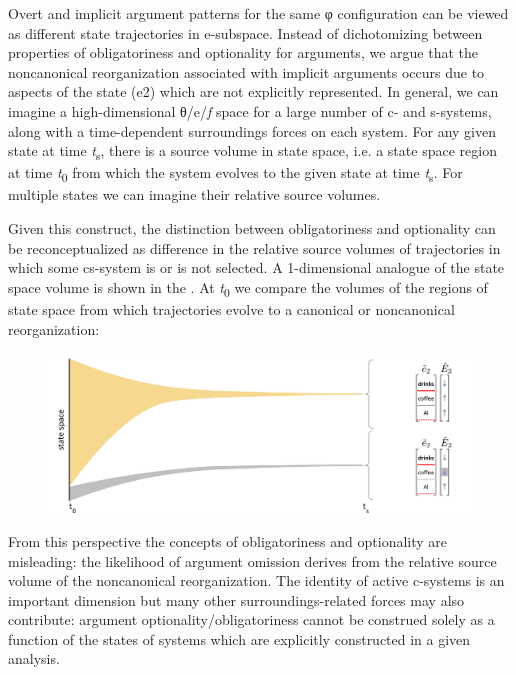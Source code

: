   Overt and implicit argument patterns for the same φ configuration can be viewed as different state trajectories in e-subspace. Instead of dichotomizing between properties of obligatoriness and optionality for arguments, we argue that the noncanonical reorganization associated with implicit arguments occurs due to aspects of the state (e2) which are not explicitly represented. In general, we can imagine a high-dimensional θ/e/\textit{f} space for a large number of c- and s-systems, along with a time-dependent surroundings forces on each system. For any given state at time \textit{t}\textsubscript{s}, there is a source volume in state space, i.e. a state space region at time \textit{t}\textsubscript{0} from which the system evolves to the given state at time \textit{t}\textsubscript{s}. For multiple states we can imagine their relative source volumes. 

  Given this construct, the distinction between obligatoriness and optionality can be reconceptualized as difference in the relative source volumes of trajectories in which some cs-system is or is not selected. A 1-dimensional analogue of the state space volume is shown in the {\figurebelow}. At \textit{t}\textsubscript{0} we compare the volumes of the regions of state space from which trajectories evolve to a canonical or noncanonical reorganization: 

  
\begin{figure}
\includegraphics[width=\textwidth]{figures/Tilsen-img88.png}
\caption{\missingcaption}
\label{fig:4:38}
\end{figure}
 

  From this perspective the concepts of obligatoriness and optionality are misleading: the likelihood of argument omission derives from the relative source volume of the noncanonical reorganization. The identity of active c-systems is an important dimension but many other surroundings-related forces may also contribute: argument optionality/obligatoriness cannot be construed solely as a function of the states of systems which are explicitly constructed in a given analysis.

